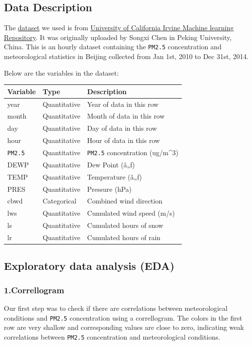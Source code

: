 \documentclass[]{article}
\begin{document}
\hypertarget{data-description}{%
\subsection{Data Description}\label{data-description}}

The
\href{https://archive.ics.uci.edu/ml/machine-learning-databases/00381/PRSA_data_2010.1.1-2014.12.31.csv}{dataset}
we used is from
\href{https://archive.ics.uci.edu/ml/datasets/Beijing+PM2.5+Data\#}{University
of California Irvine Machine learning Repository}. It was originally
uploaded by Songxi Chen in Peking University, China. This is an hourly
dataset containing the \texttt{PM2.5} concentration and meteorological
statistics in Beijing collected from Jan 1st, 2010 to Dec 31st, 2014.

Below are the variables in the dataset:

\begin{longtable}[]{@{}lll@{}}
\toprule
Variable & Type & Description\tabularnewline
\midrule
\endhead
year & Quantitative & Year of data in this row\tabularnewline
month & Quantitative & Month of data in this row\tabularnewline
day & Quantitative & Day of data in this row\tabularnewline
hour & Quantitative & Hour of data in this row\tabularnewline
\texttt{PM2.5} & Quantitative & \texttt{PM2.5} concentration
(ug/m\^{}3)\tabularnewline
DEWP & Quantitative & Dew Point (â„ƒ)\tabularnewline
TEMP & Quantitative & Temperature (â„ƒ)\tabularnewline
PRES & Quantitative & Pressure (hPa)\tabularnewline
cbwd & Categorical & Combined wind direction\tabularnewline
lws & Quantitative & Cumulated wind speed (m/s)\tabularnewline
ls & Quantitative & Cumulated hours of snow\tabularnewline
lr & Quantitative & Cumulated hours of rain\tabularnewline
\bottomrule
\end{longtable}

\hypertarget{exploratory-data-analysis-eda}{%
\subsection{Exploratory data analysis
(EDA)}\label{exploratory-data-analysis-eda}}

\hypertarget{correllogram}{%
\subsubsection{1.Correllogram}\label{correllogram}}

Our first step was to check if there are correlations between
meteorological conditions and \texttt{PM2.5} concentration using a
correllogram. The colors in the first row are very shallow and
corresponding values are close to zero, indicating weak correlations
between \texttt{PM2.5} concentration and meteorological conditions.
\end{document}
